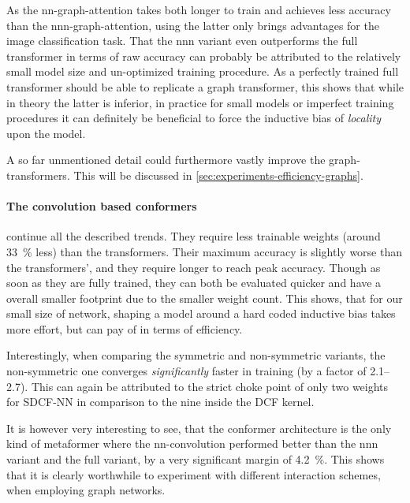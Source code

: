 As the nn-graph-attention takes both longer to train and achieves less accuracy than the nnn-graph-attention, using the latter only brings advantages for the image classification task.
That the nnn variant even outperforms the full transformer in terms of raw accuracy can probably be attributed to the relatively small model size and un-optimized training procedure.
As a perfectly trained full transformer should be able to replicate a graph transformer, this shows that while in theory the latter is inferior, in practice for small models or imperfect training procedures it can definitely be beneficial to force the inductive bias of \emph{locality} upon the model.

A so far unmentioned detail could furthermore vastly improve the graph-transformers. 
This will be discussed in \autoref{sec:experiments-efficiency-graphs}.

\paragraph{The convolution based conformers} continue all the described trends.
They require less trainable weights (around \SI[]{33}[]{\percent} less) than the transformers.
Their maximum accuracy is slightly worse than the transformers', and they require longer to reach peak accuracy.
Though as soon as they are fully trained, they can both be evaluated quicker and have a overall smaller footprint due to the smaller weight count.
This shows, that for our small size of network, shaping a model around a hard coded inductive bias takes more effort, but can pay of in terms of efficiency.

Interestingly, when comparing the symmetric and non-symmetric variants, the non-symmet\-ric one converges \emph{significantly} faster in training (by a factor of \SIrange[]{2.1}{2.7}{}). 
This can again be attributed to the strict choke point of only two weights for SDCF-NN in comparison to the nine inside the DCF kernel.

It is however very interesting to see, that the conformer architecture is the only kind of metaformer where the nn-convolution performed better than the nnn variant and the full variant, by a very significant margin of \SI[]{4.2}[]{\percent}.
This shows that it is clearly worthwhile to experiment with different interaction schemes, when employing graph networks.

